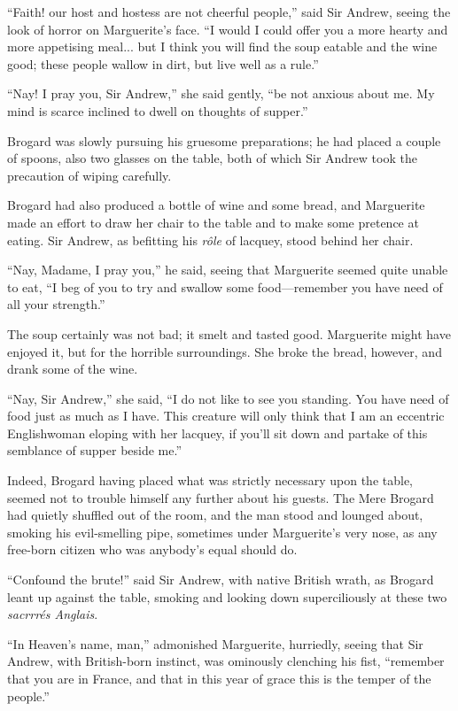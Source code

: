 \documentclass[paper=a5,BCOR=7mm,twoside,DIV=calc,12pt,usegeometry,chapterprefix,endperiod,headings=big]{scrbook}
\begin{document}
\enquote{Faith! our host and hostess are not cheerful people,} said Sir Andrew, seeing the look of horror on Marguerite's face. \enquote{I would I could offer you a more hearty and more appetising meal... but I think you will find the soup eatable and the wine good; these people wallow in dirt, but live well as a rule.}

\enquote{Nay! I pray you, Sir Andrew,} she said gently, \enquote{be not anxious about me. My mind is scarce inclined to dwell on thoughts of supper.}

Brogard was slowly pursuing his gruesome preparations; he had placed a couple of spoons, also two glasses on the table, both of which Sir Andrew took the precaution of wiping carefully.

Brogard had also produced a bottle of wine and some bread, and Marguerite made an effort to draw her chair to the table and to make some pretence at eating. Sir Andrew, as befitting his \textit{rôle} of lacquey, stood behind her chair.

\enquote{Nay, Madame, I pray you,} he said, seeing that Marguerite seemed quite unable to eat, \enquote{I beg of you to try and swallow some food---remember you have need of all your strength.}

The soup certainly was not bad; it smelt and tasted good. Marguerite might have enjoyed it, but for the horrible surroundings. She broke the bread, however, and drank some of the wine.

\enquote{Nay, Sir Andrew,} she said, \enquote{I do not like to see you standing. You have need of food just as much as I have. This creature will only think that I am an eccentric Englishwoman eloping with her lacquey, if you'll sit down and partake of this semblance of supper beside me.}

Indeed, Brogard having placed what was strictly necessary upon the table, seemed not to trouble himself any further about his guests. The Mere Brogard had quietly shuffled out of the room, and the man stood and lounged about, smoking his evil-smelling pipe, sometimes under Marguerite's very nose, as any free-born citizen who was anybody's equal should do.

\enquote{Confound the brute!} said Sir Andrew, with native British wrath, as Brogard leant up against the table, smoking and looking down superciliously at these two \textit{sacrrrés Anglais}.

\enquote{In Heaven's name, man,} admonished Marguerite, hurriedly, seeing that Sir Andrew, with British-born instinct, was ominously clenching his fist, \enquote{remember that you are in France, and that in this year of grace this is the temper of the people.}
\end{document}
